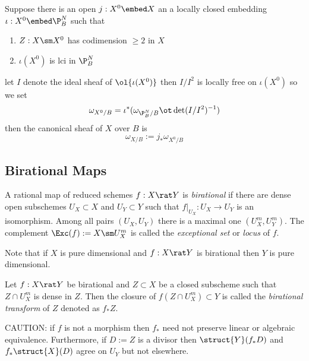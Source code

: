 \documentclass[12pt]{article}
\begin{document}
\begin{prop}
Suppose there is an open $j : X^0 \embed X$ an a locally closed embedding $\iota : X^0 \embed \P^N_B$ such that
\begin{enumerate}
\item $Z : X \sm X^0$ has codimension $\ge 2$ in $X$
\item $\iota(X^0)$ is lci in $\P^N_B$
\end{enumerate}
let $I$ denote the ideal sheaf of $\ol{\iota(X^0)}$ then $I / I^2$ is locally free on $\iota(X^0)$ so we set
\[ \omega_{X^0/B} = \iota^* (\omega_{\P^N_B/B} \ot \det(I/I^2)^{-1}) \]
then the canonical sheaf of $X$ over $B$ is
\[ \omega_{X/B} := j_* \omega_{X^0 / B} \]
\end{prop}

\renewcommand{\Diff}{\mathrm{Diff}}

\subsection{Birational Maps}

\begin{defn}
A rational map of reduced schemes $f : X \rat Y$ is \textit{birational} if there are dense open subschemes $U_X \subset X$ and $U_Y \subset Y$ such that $f|_{U_X} : U_X \to U_Y$ is an isomorphism. Among all pairs $(U_X, U_Y)$ there is a maximal one $(U_X^m, U_Y^m)$. The complement $\Exc(f) := X \sm U^m_X$ is called the \textit{exceptional set} or \textit{locus} of $f$. 
\end{defn}

\begin{rmk}
Note that if $X$ is pure dimensional and $f : X \rat Y$ is birational then $Y$ is pure dimensional.
\end{rmk}

\begin{defn}
Let $f : X \rat Y$ be birational and $Z \subset X$ be a closed subscheme such that $Z \cap U^m_X$ is dense in $Z$. Then the closure of $f(Z \cap U_X^m) \subset Y$ is called the \textit{birational transform} of $Z$ denoted as $f_* Z$.  
\end{defn}

\begin{rmk}
CAUTION: if $f$ is not a morphism then $f_*$ need not preserve linear or algebraic equivalence. Furthermore, if $D := Z$ is a divisor then $\struct{Y}(f_* D)$ and $f_* \struct{X}(D)$ agree on $U_Y$ but not elsewhere. 
\end{rmk}
\end{document}
